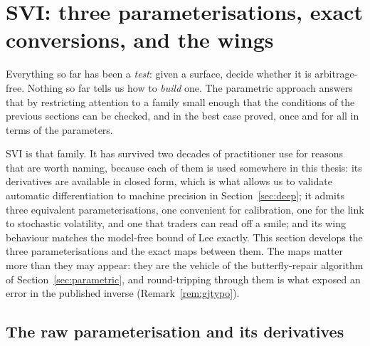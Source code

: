 
\section{SVI: three parameterisations, exact conversions, and the wings}\label{sec:svisec}

Everything so far has been a \emph{test}: given a surface, decide whether it is arbitrage-free.
Nothing so far tells us how to \emph{build} one. The parametric approach answers that by
restricting attention to a family small enough that the conditions of the previous sections can
be checked, and in the best case proved, once and for all in terms of the parameters.

SVI is that family. It has survived two decades of practitioner use for reasons that are worth
naming, because each of them is used somewhere in this thesis: its derivatives are available in
closed form, which is what allows us to validate automatic differentiation to machine precision
in Section~\ref{sec:deep}; it admits three equivalent parameterisations, one convenient for
calibration, one for the link to stochastic volatility, and one that traders can read off a
smile; and its wing behaviour matches the model-free bound of Lee exactly. This section develops
the three parameterisations and the exact maps between them. The maps matter more than they may
appear: they are the vehicle of the butterfly-repair algorithm of
Section~\ref{sec:parametric}, and round-tripping through them is what exposed an error in the
published inverse (Remark~\ref{rem:gjtypo}).

\subsection{The raw parameterisation and its derivatives}


